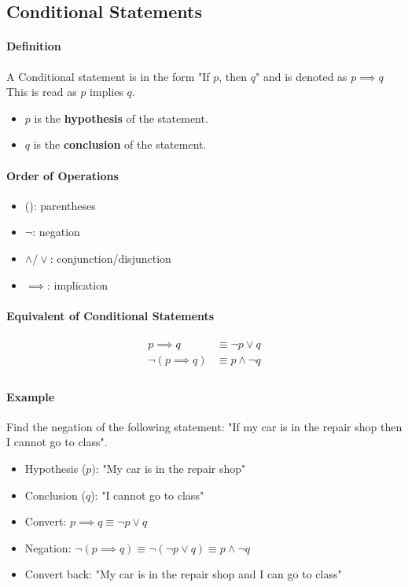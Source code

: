 \subsection{Conditional Statements}
\hrulefill
\paragraph*{Definition}
A Conditional statement is in the form "If $p$, then $q$" and is denoted as $p \implies q$ This is read as $p$ implies $q$.\\
\begin{itemize}
    \item $p$ is the \textbf{hypothesis} of the statement.
    \item $q$ is the \textbf{conclusion} of the statement.
\end{itemize}

\paragraph*{Order of Operations}
\begin{itemize}
    \item (): parentheses
    \item $\neg$: negation
    \item $\land/\lor$: conjunction/disjunction
    \item $\implies$: implication
\end{itemize}

\paragraph*{Equivalent of Conditional Statements}
\begin{align*}
    p \implies q &\equiv \neg p \lor q\\
    \neg (p \implies q) &\equiv p \land \neg q\\
\end{align*}

\paragraph*{Example}
Find the negation of the following statement: "If my car is in the repair shop then I cannot go to class".
\begin{itemize}
    \item Hypothesis ($p$): "My car is in the repair shop"
    \item Conclusion ($q$): "I cannot go to class"
    \item Convert: $p \implies q \equiv \neg p \lor q$
    \item Negation: $\neg (p \implies q) \equiv \neg (\neg p \lor q) \equiv p \land \neg q$
    \item Convert back: "My car is in the repair shop and I can go to class"
\end{itemize}

